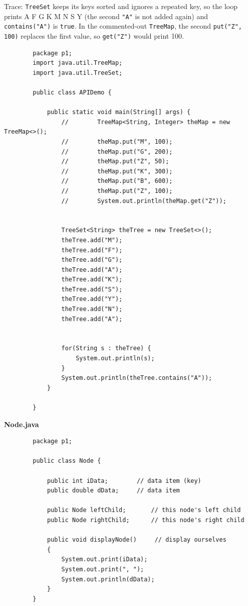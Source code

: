\documentclass[11pt]{article}
\begin{document}
	Trace: \texttt{TreeSet} keeps its keys sorted and ignores a repeated key, so the loop prints A F G K M N S Y (the second \texttt{"A"} is not added again) and \texttt{contains("A")} is \texttt{true}. In the commented-out \texttt{TreeMap}, the second \texttt{put("Z", 100)} replaces the first value, so \texttt{get("Z")} would print 100.
	\begin{lstlisting}
		package p1;
		import java.util.TreeMap;
		import java.util.TreeSet;
		
		public class APIDemo {
			
			public static void main(String[] args) {
				//        TreeMap<String, Integer> theMap = new TreeMap<>();
				//        theMap.put("M", 100);
				//        theMap.put("G", 200);
				//        theMap.put("Z", 50);
				//        theMap.put("K", 300);
				//        theMap.put("B", 600);
				//        theMap.put("Z", 100);
				//        System.out.println(theMap.get("Z"));
				
				
				TreeSet<String> theTree = new TreeSet<>();
				theTree.add("M");
				theTree.add("F");
				theTree.add("G");
				theTree.add("A");
				theTree.add("K");
				theTree.add("S");
				theTree.add("Y");
				theTree.add("N");
				theTree.add("A");
				
				
				for(String s : theTree) {
					System.out.println(s);
				}
				System.out.println(theTree.contains("A"));
			}
			
		}
	\end{lstlisting}
	
	\textbf{Node.java}
	\begin{lstlisting}
		package p1;
		
		public class Node {
			
			public int iData;        // data item (key)
			public double dData;     // data item
			
			public Node leftChild;       // this node's left child
			public Node rightChild;      // this node's right child
			
			public void displayNode()     // display ourselves
			{
				System.out.print(iData);
				System.out.print(", ");
				System.out.println(dData);
			}
		}
	\end{lstlisting}
	
\end{document}
